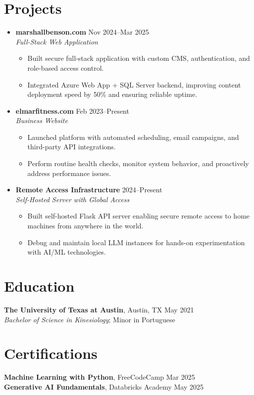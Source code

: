 \documentclass[letterpaper,10pt]{article}
\newcommand{\resumeItem}[1]{\item \small{#1}}
\begin{document}
\section*{Projects}
\begin{itemize}
  \item[]
    \textbf{marshallbenson.com} \hfill Nov 2024--Mar 2025 \\
    \textit{Full-Stack Web Application}
  \begin{itemize}
    \resumeItem{Built secure full-stack application with custom CMS, authentication, and role-based access control.}
    \resumeItem{Integrated Azure Web App + SQL Server backend, improving content deployment speed by 50\% and ensuring reliable uptime.}
  \end{itemize}

  \item[]
    \textbf{elmarfitness.com} \hfill Feb 2023--Present \\
    \textit{Business Website}
  \begin{itemize}
    \resumeItem{Launched platform with automated scheduling, email campaigns, and third-party API integrations.}
    \resumeItem{Perform routine health checks, monitor system behavior, and proactively address performance issues.}
  \end{itemize}

  \item[]
    \textbf{Remote Access Infrastructure} \hfill 2024--Present \\
    \textit{Self-Hosted Server with Global Access}
  \begin{itemize}
    \resumeItem{Built self-hosted Flask API server enabling secure remote access to home machines from anywhere in the world.}
    \resumeItem{Debug and maintain local LLM instances for hands-on experimentation with AI/ML technologies.}
  \end{itemize}
\end{itemize}

\section*{Education}
\textbf{The University of Texas at Austin}, Austin, TX \hfill May 2021 \\
\textit{Bachelor of Science in Kinesiology}; Minor in Portuguese

\section*{Certifications}
\textbf{Machine Learning with Python}, FreeCodeCamp \hfill Mar 2025 \\
\textbf{Generative AI Fundamentals}, Databricks Academy \hfill May 2025
\end{document}
